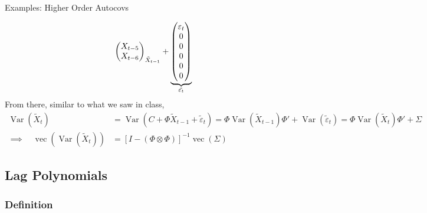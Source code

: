 \documentclass[aspectratio=169, handout]{beamer}
\newcommand{\vc}{\operatorname{vec}}
\newcommand{\Var}{\operatorname{Var}}
\begin{document}
{\begin{frame}{Examples: Higher Order Autocovs}
\begin{itemize}
\begin{align*}
{\begin{pmatrix}
          X_{t-5} \\
          X_{t-6} \\
        \end{pmatrix}
      }_{\tilde{X}_{t-1}}
      +
      \underbrace{%
        \begin{pmatrix}
          \varepsilon_t \\
          0 \\
          0 \\
          0 \\
          0 \\
          0 \\
        \end{pmatrix}
      }_{\tilde{\varepsilon_t}}
    \end{align*}
    From there, similar to what we saw in class,
    \begin{align*}
      \Var(\tilde{X}_t)
      &=
      \Var(C + \Phi \tilde{X}_{t-1}+ \tilde{\varepsilon}_t)
      =
      \Phi \Var(\tilde{X}_{t-1})\Phi'
      +
      \Var(\tilde{\varepsilon}_t)
      =
      \Phi \Var(\tilde{X}_{t})\Phi'
      + \Sigma
      \\
      \implies\quad
      \vc(\Var(\tilde{X}_t))
      &=
      [I-(\Phi\otimes\Phi)]^{-1}
      \vc(\Sigma)
    \end{align*}
\end{itemize}
\end{frame}
}



\subsection{Lag Polynomials}

\subsubsection{Definition}
\end{document}

